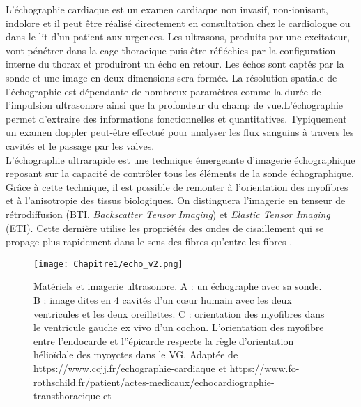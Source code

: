 L’échographie cardiaque est un examen cardiaque non invasif, non-ionisant, indolore et il peut être réalisé directement en consultation chez le cardiologue ou dans le lit d’un patient aux urgences. Les ultrasons, produits par une excitateur, vont pénétrer dans la cage thoracique puis être réfléchies par la configuration interne du thorax et produiront un écho en retour. Les échos sont captés par la sonde et une image en deux dimensions sera formée. La résolution spatiale de l’échographie est dépendante de nombreux paramètres comme la durée de l’impulsion ultrasonore ainsi que la profondeur du champ de vue.L’échographie permet d'extraire des informations fonctionnelles et quantitatives. Typiquement un examen doppler peut-être effectué pour analyser les flux sanguins à travers les cavités et le passage par les valves. \\

L’échographie ultrarapide est une technique émergeante d’imagerie échographique reposant sur la capacité de contrôler tous les éléments de la sonde échographique. Grâce à cette technique, il est possible de remonter à l’orientation des myofibres et à l’anisotropie des tissus biologiques. On distinguera l'imagerie en tenseur de rétrodiffusion \cite{Papadacci2014} (BTI, \textit{Backscatter Tensor Imaging}) et \textit{Elastic Tensor Imaging} (ETI). Cette dernière utilise les propriétés des ondes de cisaillement qui se propage plus rapidement dans le sens des fibres qu’entre les fibres \cite{Agger2020}. \\

\begin{figure}[!htbp]
  \begin{center}
    \texttt{[image: Chapitre1/echo\_v2.png]}
     \end{center}
    \caption{Matériels et imagerie ultrasonore. A : un échographe avec sa sonde. B : image dites en 4 cavités d’un cœur humain avec les deux ventricules et les deux oreillettes. C : orientation des myofibres dans le ventricule gauche ex vivo d’un cochon. L’orientation des myofibre entre l'endocarde et l''épicarde respecte la règle d’orientation hélioïdale des myoyctes dans le VG.   Adaptée de https://www.ccjj.fr/echographie-cardiaque et https://www.fo-rothschild.fr/patient/actes-medicaux/echocardiographie-transthoracique et \cite{Papadacci2014}}
  \label{fig:fig_echographie}
\end{figure}



